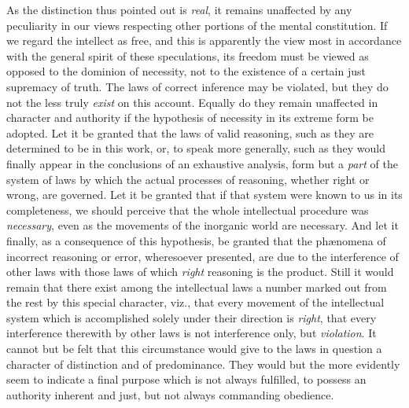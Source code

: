\documentclass[oneside]{book}
\begin{document}
As the distinction thus pointed out is \emph{real}, it remains unaffected
by any peculiarity in our views respecting other portions
of the mental constitution. If we regard the intellect as free,
and this is apparently the view most in accordance with the general
spirit of these speculations, its freedom must be viewed as
opposed to the dominion of necessity, not to the existence of a
certain just supremacy of truth. The laws of correct inference
may be violated, but they do not the less truly \emph{exist} on this account.
Equally do they remain unaffected in character and authority
if the hypothesis of necessity in its extreme form be
adopted. Let it be granted that the laws of valid reasoning,
such as they are determined to be in this work, or, to speak more
generally, such as they would finally appear in the conclusions of
an exhaustive analysis, form but a \emph{part} of the system of laws by
which the actual processes of reasoning, whether right or wrong,
are governed. Let it be granted that if that system were known
to us in its completeness, we should perceive that the whole intellectual
procedure was \emph{necessary}, even as the movements of the
inorganic world are necessary. And let it finally, as a consequence
of this hypothesis, be granted that the ph{\ae}nomena of incorrect
reasoning or error, wheresoever presented, are due to the
interference of other laws with those laws of which \emph{right} reasoning
is the product. Still it would remain that there exist among
the intellectual laws a number marked out from the rest by this
special character, viz., that every movement of the intellectual
system which is accomplished solely under their direction is
\emph{right}, that every interference therewith by other laws is not interference
only, but \emph{violation}. It cannot but be felt that this
circumstance would give to the laws in question a character of
distinction and of predominance. They would but the more
evidently seem to indicate a final purpose which is not always
fulfilled, to possess an authority inherent and just, but not
always commanding obedience.
\end{document}
